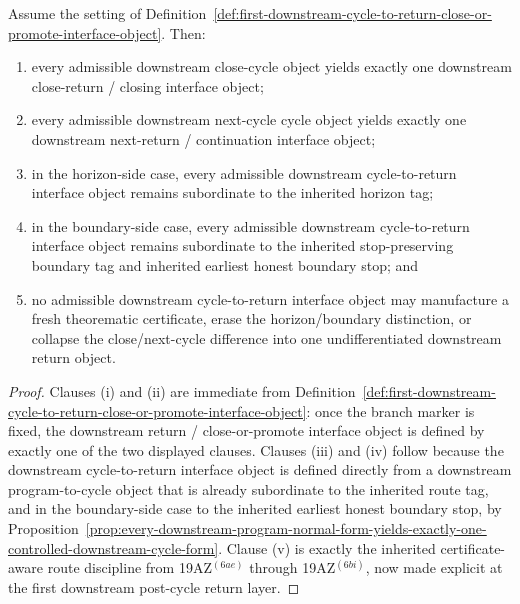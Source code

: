 \begin{proposition}
\label{prop:every-downstream-cycle-object-yields-exactly-one-downstream-return-close-or-promote-interface-object}
Assume the setting of Definition~\ref{def:first-downstream-cycle-to-return-close-or-promote-interface-object}. Then:
\begin{enumerate}[label=(\roman*)]
 \item every admissible downstream close-cycle object yields exactly one downstream close-return / closing interface object;
 \item every admissible downstream next-cycle cycle object yields exactly one downstream next-return / continuation interface object;
 \item in the horizon-side case, every admissible downstream cycle-to-return interface object remains subordinate to the inherited horizon tag;
 \item in the boundary-side case, every admissible downstream cycle-to-return interface object remains subordinate to the inherited stop-preserving boundary tag and inherited earliest honest boundary stop; and
 \item no admissible downstream cycle-to-return interface object may manufacture a fresh theorematic certificate, erase the horizon/boundary distinction, or collapse the close/next-cycle difference into one undifferentiated downstream return object.
\end{enumerate}
\end{proposition}

\begin{proof}
Clauses (i) and (ii) are immediate from Definition~\ref{def:first-downstream-cycle-to-return-close-or-promote-interface-object}: once the branch marker is fixed, the downstream return / close-or-promote interface object is defined by exactly one of the two displayed clauses. Clauses (iii) and (iv) follow because the downstream cycle-to-return interface object is defined directly from a downstream program-to-cycle object that is already subordinate to the inherited route tag, and in the boundary-side case to the inherited earliest honest boundary stop, by Proposition~\ref{prop:every-downstream-program-normal-form-yields-exactly-one-controlled-downstream-cycle-form}. Clause (v) is exactly the inherited certificate-aware route discipline from 19AZ$^{(6ae)}$ through 19AZ$^{(6bi)}$, now made explicit at the first downstream post-cycle return layer.
\end{proof}

